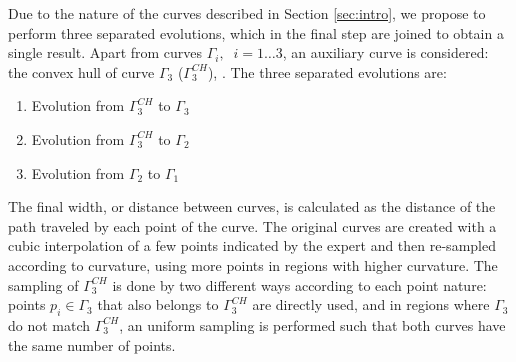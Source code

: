 \documentclass{article}
\begin{document}
Due to the nature of the curves described in Section \ref{sec:intro}, we propose to perform three separated evolutions, which in the final step are joined to obtain a single result. Apart from curves $\Gamma_i,\;\; i=1\dots3$, an auxiliary curve is considered: the convex hull of curve $\Gamma_3$ ($\Gamma_3^{CH}$), \cite{libro}. The three separated evolutions are:
\begin{enumerate}
\item Evolution from $\Gamma_3^{CH}$ to $\Gamma_3$
\item Evolution from $\Gamma_3^{CH}$ to $\Gamma_2$
\item Evolution from $\Gamma_2$ to $\Gamma_1$
\end{enumerate}
The final width, or distance between curves, is calculated as the distance of the path traveled by each point of the curve. The original curves are created with a cubic interpolation of a few points indicated by the expert and then re-sampled according to curvature, using more points in regions with higher curvature. The sampling of $\Gamma_3^{CH}$ is done by two different ways according to each point nature: points $p_i\in\Gamma_{3}$ that also belongs to $\Gamma_3^{CH}$ are directly used, and in regions where $\Gamma_3$ do not match $\Gamma_3^{CH}$, an uniform sampling is performed such that both curves have the same number of points.
\end{document}

